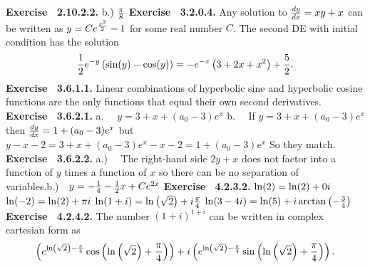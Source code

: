  {\noindent \protect \bf  Exercise ~2.10.2.2.}  b.) $\protect \frac  {\pi }{8}$\protect \newline   \protect \newline  \protect \newline  
 {\noindent \protect \bf  Exercise ~3.2.0.4.} Any solution to $\protect \frac  {dy}{dx}=xy+x$ can be written as $y=Ce^{\protect \frac  {x^2}{2}}-1$ for some real number $C$. The second DE with initial condition has the solution $$\protect \frac  {1}{2}e^{-y}\left (\protect \qopname  \relax o{sin}(y)-\protect \qopname  \relax o{cos}(y)\right )=-e^{-x}\left (3+2x+x^2\right )+\protect \frac  {5}{2}. $$ \protect \newline  \protect \newline  
 {\noindent \protect \bf  Exercise ~3.6.1.1.} Linear combinations of hyperbolic sine and hyperbolic cosine functions are the only functions that equal their own second derivatives.  \protect \newline  \protect \newline  
 {\noindent \protect \bf  Exercise ~3.6.2.1.} a.~~ $y=3 +x + (a_0-3)e^x$ b.~~ If $y =3 +x + (a_0-3)e^x$ then $\protect \frac  {dy}{dx} = 1 +(a_0-3)e^x$ but $y-x-2 = 3+x+(a_0-3)e^x -x-2 = 1 + (a_0-3)e^x$ So they match.  \protect \newline  \protect \newline  
 {\noindent \protect \bf  Exercise ~3.6.2.2.} a.)~~ The right-hand side $2y+x$ does not factor into a function of $y$ times a function of $x$ so there can be no separation of variables.\protect \newline  b.)~~$y = -\protect \frac  {1}{4} -\protect \frac  {1}{2}x +Ce^{2x}$ \protect \newline   \protect \newline  \protect \newline  
 {\noindent \protect \bf  Exercise ~4.2.3.2.} \textbullet $\protect \qopname  \relax o{ln}(2)=\protect \qopname  \relax o{ln}(2)+0i$ \textbullet $\protect \qopname  \relax o{ln}(-2)=\protect \qopname  \relax o{ln}(2)+\pi i$ \textbullet $\protect \qopname  \relax o{ln}(1+i)=\protect \qopname  \relax o{ln}\left (\protect \sqrt  {2}\right )+i\protect \frac  {\pi }{4}$ \textbullet $\protect \qopname  \relax o{ln}(3-4i)=\protect \qopname  \relax o{ln}(5)+i\protect \qopname  \relax o{arctan}\left (-\protect \frac  {3}{4}\right )$ \protect \newline  \protect \newline  
 {\noindent \protect \bf  Exercise ~4.2.4.2.} The number $(1+i)^{1+i}$ can be written in complex cartesian form as $$\left (e^{\protect \qopname  \relax o{ln}\left (\protect \sqrt  {2}\right )-\protect \frac  {\pi }{4}}\protect \qopname  \relax o{cos}\left (\protect \qopname  \relax o{ln}\left (\protect \sqrt  {2}\right )+\protect \frac  {\pi }{4} \right )\right )+i\left (e^{\protect \qopname  \relax o{ln}\left (\protect \sqrt  {2}\right )-\protect \frac  {\pi }{4}}\protect \qopname  \relax o{sin}\left (\protect \qopname  \relax o{ln}\left (\protect \sqrt  {2}\right )+\protect \frac  {\pi }{4} \right )\right ). $$ \protect \newline  \protect \newline  
